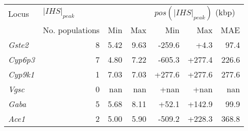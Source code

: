 \begin{tabular}{lrrrrrr}
\toprule
           Locus & \multicolumn{3}{l}{$|IHS|_{peak}$} & \multicolumn{3}{l}{$pos(|IHS|_{peak})$ (kbp)} \\
                 & No. populations &  Min &  Max &                       Min &    Max &   MAE \\
\midrule
  \textit{Gste2} &               8 & 5.42 & 9.63 &                    -259.6 &   +4.3 &  97.4 \\
 \textit{Cyp6p3} &               7 & 4.80 & 7.22 &                    -605.3 & +277.4 & 226.6 \\
 \textit{Cyp9k1} &               1 & 7.03 & 7.03 &                    +277.6 & +277.6 & 277.6 \\
   \textit{Vgsc} &               0 &  nan &  nan &                      +nan &   +nan &   nan \\
   \textit{Gaba} &               5 & 5.68 & 8.11 &                     +52.1 & +142.9 &  99.9 \\
   \textit{Ace1} &               2 & 5.00 & 5.90 &                    -509.2 & +228.3 & 368.8 \\
\bottomrule
\end{tabular}
